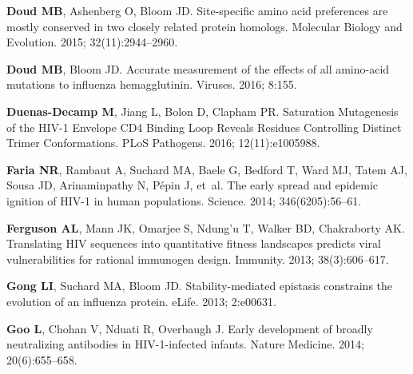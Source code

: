 \documentclass[9pt]{elife}
\begin{document}
\begin{thebibliography}{114}
\textbf{\color{eLifeMediumGrey} Doud MB}, Ashenberg O, Bloom JD.
\newblock Site-specific amino acid preferences are mostly conserved in two
  closely related protein homologs.
\newblock Molecular Biology and Evolution.  2015; 32(11):2944--2960.

\textbf{\color{eLifeMediumGrey} Doud MB}, Bloom JD.
\newblock Accurate measurement of the effects of all amino-acid mutations to
  influenza hemagglutinin.
\newblock Viruses.  2016; 8:155.

\textbf{\color{eLifeMediumGrey} Duenas-Decamp M}, Jiang L, Bolon D, Clapham PR.
\newblock Saturation Mutagenesis of the {HIV-1} Envelope {CD4} Binding Loop
  Reveals Residues Controlling Distinct Trimer Conformations.
\newblock PLoS Pathogens.  2016; 12(11):e1005988.

\textbf{\color{eLifeMediumGrey} Faria NR}, Rambaut A, Suchard MA, Baele G,
  Bedford T, Ward MJ, Tatem AJ, Sousa JD, Arinaminpathy N, P{\'e}pin J, et~al.
\newblock The early spread and epidemic ignition of {HIV-1} in human
  populations.
\newblock Science.  2014; 346(6205):56--61.

\textbf{\color{eLifeMediumGrey} Ferguson AL}, Mann JK, Omarjee S, Ndung’u T,
  Walker BD, Chakraborty AK.
\newblock Translating {HIV} sequences into quantitative fitness landscapes
  predicts viral vulnerabilities for rational immunogen design.
\newblock Immunity.  2013; 38(3):606--617.

\textbf{\color{eLifeMediumGrey} Gong LI}, Suchard MA, Bloom JD.
\newblock Stability-mediated epistasis constrains the evolution of an influenza
  protein.
\newblock eLife.  2013; 2:e00631.

\textbf{\color{eLifeMediumGrey} Goo L}, Chohan V, Nduati R, Overbaugh J.
\newblock Early development of broadly neutralizing antibodies in
  HIV-1-infected infants.
\newblock Nature Medicine.  2014; 20(6):655--658.


\end{thebibliography}
\end{document}
